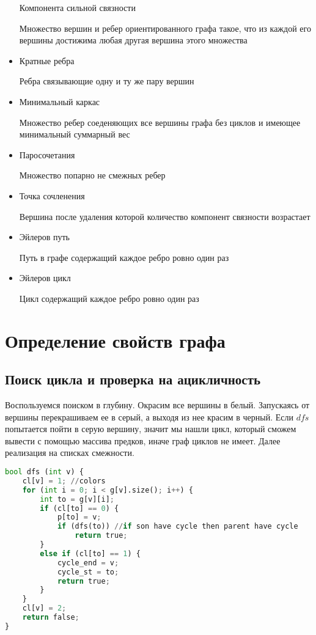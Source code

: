 \begin{itemize}
    Компонента сильной связности
    \begin{mydef}
        Множество вершин и ребер ориентированного графа такое, что из каждой его           вершины достижима любая другая вершина этого множества
    \end{mydef}
\item     
    Кратные ребра
    \begin{mydef}
        Ребра связывающие одну и ту же пару вершин
    \end{mydef}
\item     
    Минимальный каркас
    \begin{mydef}
        Множество ребер соеденяющих все вершины графа без циклов и имеющее               минимальный суммарный вес
    \end{mydef}
\item     
    Паросочетания
    \begin{mydef}
        Множество попарно не смежных ребер
    \end{mydef}
\item     
    Точка сочленения
    \begin{mydef}
        Вершина после удаления которой количество компонент связности возрастает
    \end{mydef}
\item     
    Эйлеров путь
    \begin{mydef}
        Путь в графе содержащий каждое ребро ровно один раз
    \end{mydef}
\item     
    Эйлеров цикл
    \begin{mydef}
        Цикл содержащий каждое ребро ровно один раз
    \end{mydef}
\end{itemize}
\section{Определение свойств графа}
\subsection{Поиск цикла и проверка на ацикличность}
Воспользуемся поиском в глубину. Окрасим все вершины в белый. Запускаясь от вершины перекрашиваем ее в серый, а выходя из нее красим в черный. Если ${dfs}$ попытается пойти в серую вершину, значит мы нашли цикл, который сможем вывести с помощью массива предков, иначе граф циклов не имеет. Далее реализация на списках смежности.
\begin{lstlisting}[language=Python]
bool dfs (int v) {
	cl[v] = 1; //colors
	for (int i = 0; i < g[v].size(); i++) {
		int to = g[v][i];
		if (cl[to] == 0) {
			p[to] = v; 
			if (dfs(to)) //if son have cycle then parent have cycle
			    return true;
		}
		else if (cl[to] == 1) {
			cycle_end = v;
			cycle_st = to;
			return true;
		}
	}
	cl[v] = 2;
	return false;
}
\end{lstlisting}
